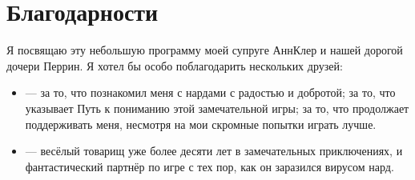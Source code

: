 \documentclass[letterpaper,10pt,russian]{sphinxmanual}
\begin{document}
\chapter{Благодарности}
\label{\detokenize{index:remerciements}}
\sphinxAtStartPar
Я посвящаю эту небольшую программу моей супруге Анн\sphinxhyphen{}Клер и нашей дорогой дочери Перрин. Я хотел бы особо поблагодарить нескольких друзей:
\begin{itemize}
\item {} 
\sphinxAtStartPar
{} — за то, что познакомил меня с нардами с радостью и добротой; за то, что указывает Путь к пониманию этой замечательной игры; за то, что продолжает поддерживать меня, несмотря на мои скромные попытки играть лучше.

\item {} 
\sphinxAtStartPar
{} — весёлый товарищ уже более десяти лет в замечательных приключениях, и фантастический партнёр по игре с тех пор, как он заразился вирусом нард.

\end{itemize}



\renewcommand{\indexname}{Алфавитный указатель}
\printindex
\end{document}
